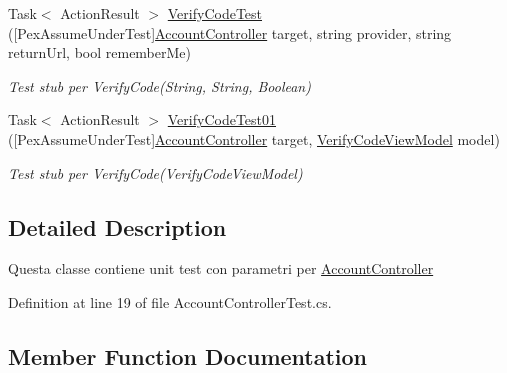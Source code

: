 \begin{DoxyCompactItemize}
Task$<$ Action\+Result $>$ \mbox{\hyperlink{class_brew_day2_1_1_controllers_1_1_testsn_1_1_account_controller_test_a9870e1e95022949b787b3c88ce3d791b}{Verify\+Code\+Test}} (\mbox{[}Pex\+Assume\+Under\+Test\mbox{]}\mbox{\hyperlink{class_brew_day2_1_1_controllers_1_1_account_controller}{Account\+Controller}} target, string provider, string return\+Url, bool remember\+Me)
\begin{DoxyCompactList}\small\item\em Test stub per Verify\+Code(\+String, String, Boolean)\end{DoxyCompactList}\item 
Task$<$ Action\+Result $>$ \mbox{\hyperlink{class_brew_day2_1_1_controllers_1_1_testsn_1_1_account_controller_test_a0e750bd15163f01e4b992930bcfbe2f4}{Verify\+Code\+Test01}} (\mbox{[}Pex\+Assume\+Under\+Test\mbox{]}\mbox{\hyperlink{class_brew_day2_1_1_controllers_1_1_account_controller}{Account\+Controller}} target, \mbox{\hyperlink{class_brew_day2_1_1_models_1_1_verify_code_view_model}{Verify\+Code\+View\+Model}} model)
\begin{DoxyCompactList}\small\item\em Test stub per Verify\+Code(\+Verify\+Code\+View\+Model)\end{DoxyCompactList}\end{DoxyCompactItemize}


\subsection{Detailed Description}
Questa classe contiene unit test con parametri per \mbox{\hyperlink{class_brew_day2_1_1_controllers_1_1_account_controller}{Account\+Controller}}



Definition at line 19 of file Account\+Controller\+Test.\+cs.



\subsection{Member Function Documentation}
\mbox{\label{class_brew_day2_1_1_controllers_1_1_testsn_1_1_account_controller_test_a91de211f4957a161dd93f783b9146525}} 

